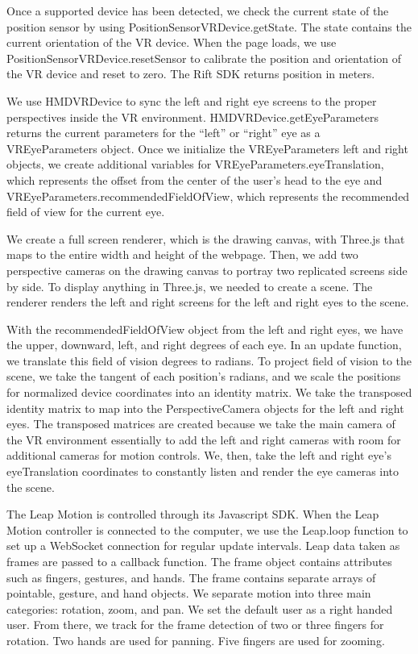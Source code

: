 \documentclass{vgtc}                          %
\begin{document}
Once a supported device has been detected, we check the current state of the position sensor by using PositionSensorVRDevice.getState. The state contains the current orientation of the VR device. When the page loads,
 we use PositionSensorVRDevice.resetSensor to calibrate the position and orientation of the VR device and reset to zero. The Rift SDK returns position in meters.

We use HMDVRDevice to sync the left and right eye screens to the proper perspectives inside the VR environment. HMDVRDevice.getEyeParameters returns the current parameters for the “left” or “right” eye as a VREyeParameters object. Once we initialize the VREyeParameters left and right objects, we create additional variables for VREyeParameters.eyeTranslation, which represents the offset from the center of the user’s head to the eye and VREyeParameters.recommendedFieldOfView, which represents the recommended field of view for the current eye. 

We create a full screen renderer, which is the drawing canvas, with Three.js that maps to the entire width and height of the webpage. Then, we add two perspective cameras on the drawing canvas to portray two replicated screens side by side. To display anything in Three.js, we needed to create a scene. The renderer renders the left and right screens for the left and right eyes to the scene. 

With the recommendedFieldOfView object from the left and right eyes, we have the upper, downward, left, and right degrees of each eye. In an update function, we translate this field of vision degrees to radians. To project field of vision to the scene, we take the tangent of each position’s radians, and we scale the positions for normalized device coordinates into an identity matrix. We take the transposed identity matrix to map into the PerspectiveCamera objects for the left and right eyes. The transposed matrices are created because we take the main camera of the VR environment essentially to add the left and right cameras with room for additional cameras for motion controls. We, then, take the left and right eye’s eyeTranslation coordinates to constantly listen and render the eye cameras into the scene. 

The Leap Motion is controlled through its Javascript SDK. When the Leap Motion controller is connected to the computer, we use the Leap.loop function to set up a WebSocket connection for regular update intervals. Leap data taken as frames are passed to a callback function. The frame object contains attributes such as fingers, gestures, and hands. The frame contains separate arrays of pointable, gesture, and hand objects. We separate motion into three main categories: rotation, zoom, and pan. We set the default user as a right handed user. From there, we track for the frame detection of two or three fingers for rotation. Two hands are used for panning. Five fingers are used for zooming. 
\end{document}
